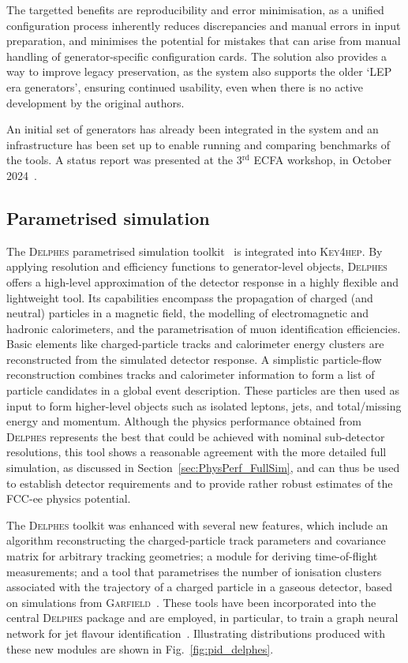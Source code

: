 The targetted benefits are reproducibility and error minimisation, 
as a unified configuration process inherently reduces discrepancies and manual errors in input preparation, 
and minimises the potential for mistakes that can arise from manual handling of generator-specific configuration cards. 
The solution also provides a way to improve legacy preservation, 
as the system also supports the older `LEP era generators', 
ensuring continued usability, even when there is no active development by the original authors.

An initial set of generators has already been integrated in the system 
and an infrastructure has been set up to enable running and comparing benchmarks of the tools. 
A status report was presented at the 3$^\text{rd}$ ECFA workshop, in October 2024~\cite{GenConfigECFAParis}.

\subsection{Parametrised simulation}
\label{sec:delphes}

The \textsc{Delphes} parametrised simulation toolkit~\cite{delphes} is integrated into \textsc{Key4hep}. 
By applying resolution and efficiency functions to generator-level objects, \textsc{Delphes} offers a high-level approximation of the detector response in a highly flexible and lightweight tool. Its capabilities encompass the propagation of charged (and neutral) particles in a magnetic field, the modelling of electromagnetic and hadronic calorimeters, and the parametrisation of muon identification efficiencies. 
Basic elements like charged-particle tracks and calorimeter energy clusters are reconstructed from the simulated detector response. A simplistic particle-flow reconstruction combines tracks and calorimeter information to form a list of particle candidates in a global event description. These particles are then used as input to form higher-level objects such as isolated leptons, jets, and total/missing energy and momentum.  Although the physics performance obtained from \textsc{Delphes} represents 
the best that could be achieved with nominal sub-detector resolutions, this tool shows a reasonable agreement with the more detailed full simulation, as discussed in Section~\ref{sec:PhysPerf_FullSim}, and can thus be used to establish detector requirements and to provide rather robust estimates of the FCC-ee physics potential.   

The \textsc{Delphes} toolkit was enhanced with several new features, which include an algorithm reconstructing the charged-particle track parameters and covariance matrix for arbitrary tracking geometries;  a module for deriving time-of-flight measurements; 
and a tool that parametrises the number of ionisation clusters associated with the trajectory of a charged particle in a gaseous detector, based on simulations from \textsc{Garfield}~\cite{garfield}. These tools have been incorporated into the central \textsc{Delphes} package and are employed, in particular, to train a graph neural network for jet flavour identification~\cite{flavorTaggingDelphes}. Illustrating distributions produced with these new modules are shown in Fig.~\ref{fig:pid_delphes}. 

